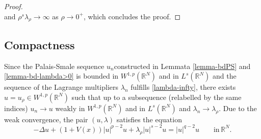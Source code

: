 \documentclass[11pt,reqno]{amsart}
\theoremstyle{definition}
\numberwithin{equation}{section}
\numberwithin{theorem}{section}
\numberwithin{equation}{section}
\numberwithin{theorem}{section}
\newcommand{\rn}{\mathbb{R}^N}
\newcommand{\R}{\mathbb{R}}
\newcommand{\raj}[1]{{\textcolor{magenta}{#1}}} %
\begin{document}
\begin{proof}
\begin{equation}
\end{equation}
and $\rho^s\lambda_\rho\to\infty$ as $\rho\to 0^+$, which concludes the proof. %

\end{proof}

\subsection{Compactness}
Since the Palais-Smale sequence $u_n$constructed in Lemmata \ref{lemma-bdPS} and \ref{lemma-bd-lambda>0} is bounded in $W^{1,p}(\rn)$ and in $L^s(\rn)$ and the sequence of the Lagrange multipliers $\lambda_n$ fulfills \eqref{lambda-infty}, there exists $u=u_\rho\in W^{1,p}(\rn)$ such that up to a subsequence (relabelled by the same indices) $u_n\to u$ weakly in $W^{1,p}(\rn)$ and in $L^s(\rn)$ and $\lambda_n\to \lambda_\rho$. Due to the weak convergence, the pair $(u,\lambda)$ satisfies the equation
\begin{equation}
\label{eq-u}
-\Delta u+(1+V(x))|u|^{p-2}u+\lambda_\rho |u|^{s-2}u=|u|^{q-2}u\qquad\text{in}\,\rn.    
\end{equation}
\end{document}
